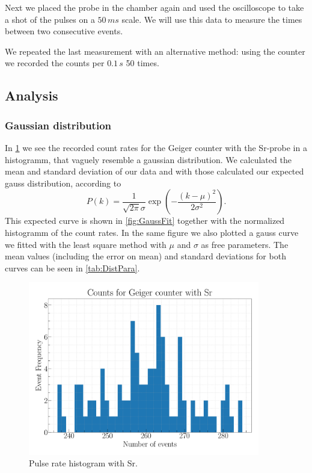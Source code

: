 Next we placed the probe in the chamber again and used the oscilloscope to take a shot of the pulses on a $50\,ms$ scale. We will use this data to measure the times between two consecutive events.

We repeated the last measurement with an alternative method: using the counter we recorded the counts per $0.1\,s$ 50 times.

\subsection{Analysis}

\subsubsection{Gaussian distribution}

In \cref{fig:GaussHist} we see the recorded count rates for the Geiger counter with the Sr-probe in a histogramm, that vaguely resemble a gaussian distribution. We calculated the mean and standard deviation of our data and with those calculated our expected gauss distribution, according to
\begin{equation}
P(k) = \frac{1}{\sqrt{2\pi}\sigma} \exp(-\frac{(k-\mu)^2}{2\sigma^2}).
\end{equation}
This expected curve is shown in \cref{fig:GaussFit} together with the normalized histogramm of the count rates. In the same figure we also plotted a gauss curve we fitted with the least square method with $\mu$ and $\sigma$ as free parameters. The mean values (including the error on mean) and standard deviations for both curves can be seen in \cref{tab:DistPara}.

\begin{figure}[H]
\centering
\includegraphics[width=0.9\textwidth]{../Figures/Geiger_gauss_histogram.pdf}
\caption{Pulse rate histogram with Sr.}
\label{fig:GaussHist}
\end{figure}


